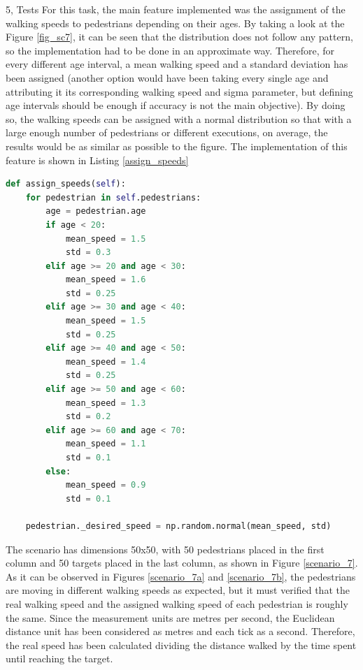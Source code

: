 \documentclass[10pt,a4paper]{article}
\begin{document}
\begin{task}{5, Tests}
For this task, the main feature implemented was the assignment of the walking speeds to pedestrians depending on their ages. By taking a look at the Figure \ref{fig_sc7}, it can be seen that the distribution does not follow any pattern, so the implementation had to be done in an approximate way. Therefore, for every different age interval, a mean walking speed and a standard deviation has been assigned (another option would have been taking every single age and attributing it its corresponding walking speed and sigma parameter, but defining age intervals should be enough if accuracy is not the main objective). By doing so, the walking speeds can be assigned with a normal distribution so that with a large enough number of pedestrians or different executions, on average, the results would be as similar as possible to the figure. The implementation of this feature is shown in Listing \ref{assign_speeds}
\vspace{30mm}
\begin{lstlisting}[language=Python, caption=Normal distribution of walking speeds depending on different age intervals, xleftmargin=.17\textwidth, label={assign_speeds}]
def assign_speeds(self):
    for pedestrian in self.pedestrians:
        age = pedestrian.age
        if age < 20:
            mean_speed = 1.5
            std = 0.3
        elif age >= 20 and age < 30:
            mean_speed = 1.6
            std = 0.25
        elif age >= 30 and age < 40:
            mean_speed = 1.5
            std = 0.25
        elif age >= 40 and age < 50:
            mean_speed = 1.4
            std = 0.25
        elif age >= 50 and age < 60:
            mean_speed = 1.3
            std = 0.2
        elif age >= 60 and age < 70:
            mean_speed = 1.1
            std = 0.1
        else:
            mean_speed = 0.9
            std = 0.1

    pedestrian._desired_speed = np.random.normal(mean_speed, std)
\end{lstlisting}

The scenario has dimensions 50x50, with 50 pedestrians placed in the first column and 50 targets placed in the last column, as shown in Figure \ref{scenario_7}. As it can be observed in Figures \ref{scenario_7a} and \ref{scenario_7b}, the pedestrians are moving in different walking speeds as expected, but it must verified that the real walking speed and the assigned walking speed of each pedestrian is roughly the same. Since the measurement units are metres per second, the Euclidean distance unit has been considered as metres and each tick as a second. Therefore, the real speed has been calculated dividing the distance walked by the time spent until reaching the target.



\end{task}
\end{document}
